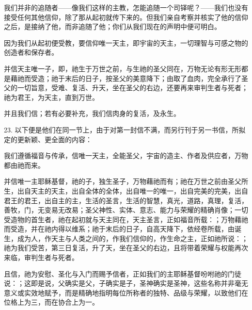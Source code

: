 我们并非的追随者——像我们这样的主教，怎能追随一个司铎呢？——我们也没有接受任何其他信仰，除了那从起初就传下来的。但我们亲自考察并核实了他的信仰之后，是接纳了他，而非追随了他；你们从我们现在的声明中便可明白。\par

因为我们从起初便受教，要信仰唯一天主，即宇宙的天主，一切理智与可感之物的创造者和保存者。\par

并信天主唯一子，即，祂生于万世之前，与生祂的圣父同在，万物无论有形无形都是藉祂而受造；祂于末后的日子，按圣父的美意降下；由取了血肉，完全承行了圣父的一切旨意，受难、复活、升天，坐在圣父的右边，还要再来审判生者与死者；祂为君王，为天主，直到万世。\par

并且我们信；若有必要补充，我们信肉身的复活，及永生。\par

23. 以下便是他们在同一节上，由于对第一封信不满，而另行刊于另一书信，所拟定的更新颖、更全面的内容：\par

我们遵循福音与传承，信唯一天主，全能圣父，宇宙的造主、作者及供应者，万物都由祂而来。\par

并信唯一主耶稣基督，祂的子，独生圣子，万物藉祂而有；祂在万世之前由圣父所生，出自天主的天主，出自全体的全体，出自唯一的唯一，出自完美的完美，出自君王的君王，出自主的主，生活的圣言，生活的智慧，真光，道路，真理，复活，善牧，门，无变易无改易；圣父神性、实体、意志、能力与荣耀的精确肖像；一切受造物的首生者，祂在起初就与天主同在，天主圣言，正如福音所载：；万物藉祂而受造，并在祂内得以维系；祂于末后的日子，自高天降下，依经卷所载，由诞生，成为人，作天主与人类之间的，作我们信仰的，作生命之主，正如祂所说：；祂为我们受苦，第三日复活，升了天，坐在圣父的右边，且将带着荣耀与权能再次来临，审判生者与死者。\par

且信，祂为安慰、圣化与入门而赐予信者，正如我们的主耶稣基督吩咐祂的门徒说：；这即是说，父确实是父，子确实是子，圣神确实是圣神，这些名称并非毫无意义或实效地赋予，而是精确地指明每位所称者的独特、品级与荣耀，以致他们在位格上为三，而在协合上为一。\par

